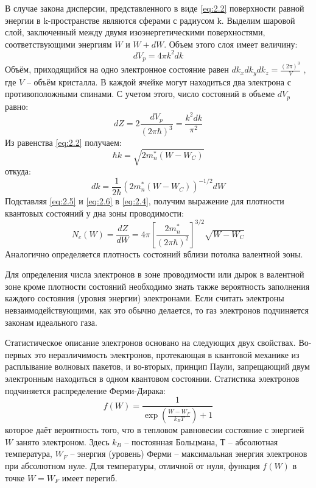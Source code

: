 В случае закона дисперсии, представленного в виде \eqref{eq:2.2} поверхности равной энергии в k-пространстве являются
сферами с радиусом k. Выделим шаровой слой, заключенный между двумя изоэнергетическими поверхностями, соответствующими
энергиям $W$ и $W+dW$. Объем этого слоя имеет величину: 
\begin{equation}
	dV_p = 4 \pi k^2 d k
	\label{eq:2.3}
\end{equation}
Объём, приходящийся на одно электронное состояние равен $dk_x dk_y dk_z = \frac{(2 \pi)^3}{V}$ , где $V$ – объём
кристалла. В каждой ячейке могут находиться два электрона с противоположными спинами. С учетом этого, число состояний в
объеме $dV_p$ равно: 
\begin{equation}
	d Z=2 \frac{d V_{p}}{(2 \pi \hbar)^{3}}=\frac{k^{2} d k}{\pi^{2}}
	\label{eq:2.4}
\end{equation}
Из равенства \eqref{eq:2.2} получаем: 
\begin{equation}
	\hbar k=\sqrt{2 m_{n}^{*}\left(W-W_{C}\right)}
	\label{eq:2.5}
\end{equation}
откуда:
\begin{equation}
	d k=\frac{1}{2 \hbar}\left(2 m_{n}^{*}\left(W-W_{C}\right)\right)^{-1 / 2} d W
	\label{eq:2.6}
\end{equation}
Подставляя \eqref{eq:2.5} и \eqref{eq:2.6} в \eqref{eq:2.4}, получим выражение для плотности квантовых состояний у дна зоны
проводимости:
\begin{equation}
	N_{c}(W)=\frac{d Z}{d W}=4 \pi\left[\frac{2 m_{n}^{*}}{(2 \pi \hbar)^{2}}\right]^{3 / 2} \sqrt{W-W_{C}}
	\label{eq:2.7}
\end{equation} 
Аналогично определяется плотность состояний вблизи потолка валентной зоны.

Для определения числа электронов в зоне проводимости или дырок в валентной зоне кроме плотности состояний необходимо
знать также вероятность заполнения каждого состояния (уровня энергии) электронами. Если считать электроны
невзаимодействующими, как это обычно делается, то газ электронов подчиняется законам идеального газа. 

Статистическое описание электронов основано на следующих двух свойствах. Во-первых это неразличимость электронов,
протекающая в квантовой механике из расплывание волновых пакетов, и во-вторых, принцип Паули, запрещающий двум
электронным находиться в одном квантовом состоянии. Статистика электронов подчиняется распределение Ферми-Дирака:   
\begin{equation}
	f(W) = \frac{1}{\exp(\frac{W-W_F}{k_B T})+1}
	\label{eq:2.8}
\end{equation}
которое даёт вероятность того, что в тепловом равновесии состояние с энергией $W$ занято электроном. Здесь $k_B$ –
постоянная Больцмана, $Т$ – абсолютная температура, $W_F$ – энергия (уровень) Ферми – максимальная энергия электронов при
абсолютном нуле. Для температуры, отличной от нуля, функция $f(W)$ в точке $W = W_F$ имеет перегиб.

